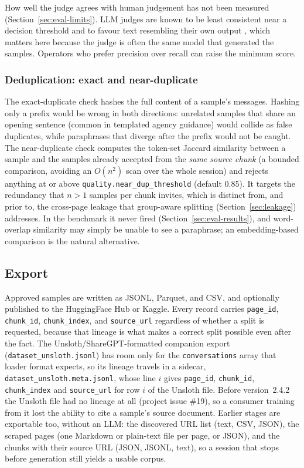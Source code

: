 \documentclass[11pt]{article}
\begin{document}
How well the judge agrees with human judgement has not been measured
(Section~\ref{sec:eval-limits}). LLM judges are known to be least
consistent near a decision threshold \cite{zheng2023judging} and to favour
text resembling their own output \cite{panickssery2024selfpref}, which
matters here because the judge is often the same model that generated the
samples. Operators who prefer precision over recall can raise the minimum
score.

\subsubsection{Deduplication: exact and near-duplicate}
\label{sec:dedup}
The exact-duplicate check hashes the full content of a sample's messages.
Hashing only a prefix would be wrong in both directions: unrelated samples
that share an opening sentence (common in templated agency guidance) would
collide as false duplicates, while paraphrases that diverge after the
prefix would not be caught. The near-duplicate check computes the
token-set Jaccard similarity between a sample and the samples already
accepted from the \emph{same source chunk} (a bounded comparison, avoiding
an $O(n^2)$ scan over the whole session) and rejects anything at or above
\texttt{quality.near\_dup\_threshold} (default 0.85). It targets the
redundancy that $n>1$ samples per chunk invites, which is distinct from,
and prior to, the cross-page leakage that group-aware splitting
(Section~\ref{sec:leakage}) addresses. In the benchmark it never fired
(Section~\ref{sec:eval-results}), and word-overlap similarity may simply be
unable to see a paraphrase; an embedding-based comparison is the natural
alternative.

\subsection{Export}
\label{sec:export}
Approved samples are written as JSONL, Parquet, and CSV, and optionally
published to the HuggingFace Hub or Kaggle. Every record carries
\texttt{page\_id}, \texttt{chunk\_id}, \texttt{chunk\_index}, and
\texttt{source\_url} regardless of whether a split is requested, because
that lineage is what makes a correct split possible even after the
fact. The Unsloth/ShareGPT-formatted companion export
(\texttt{dataset\_unsloth.jsonl}) has room only for the
\texttt{conversations} array that loader format expects, so its lineage
travels in a sidecar, \texttt{dataset\_unsloth.meta.jsonl}, whose line
$i$ gives \texttt{page\_id}, \texttt{chunk\_id}, \texttt{chunk\_index} and
\texttt{source\_url} for row $i$ of the Unsloth file. Before
version~2.4.2 the Unsloth file had no lineage at all (project issue
\#19), so a consumer training from it lost the ability to cite a sample's
source document.
Earlier stages are exportable too, without an LLM: the discovered URL
list (text, CSV, JSON), the scraped pages (one Markdown or plain-text file
per page, or JSON), and the chunks with their source URL (JSON, JSONL,
text), so a session that stops before generation still yields a usable
corpus.
\end{document}
